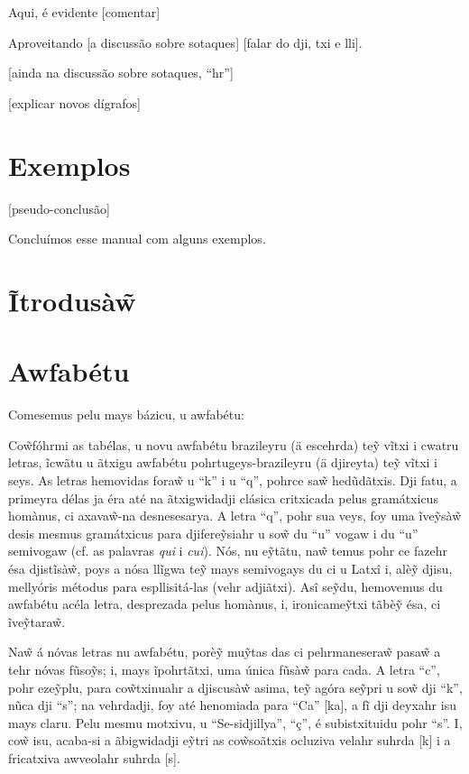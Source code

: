 \documentclass[12pt, a5paper, titlepage]{article}
\begin{document}
\begin{bilingualpages}
    Aqui, é evidente [comentar]

    Aproveitando [a discussão sobre sotaques] [falar do dji, txi e lli].

    [ainda na discussão sobre sotaques, ``hr'']

    [explicar novos dígrafos]


    \section{Exemplos}
    [pseudo-conclusão]

    Concluímos esse manual com alguns exemplos.

    \leftpage
    \section{Ĩtrodusà\~w}

    \newpage
    \section{Awfabétu}
    Comesemus pelu mays bázicu, u awfabétu:
    \BrTableAbc

    Co\~wfóhrmi as tabélas, u novu awfabétu brazileyru (ä escehrda) te\~y vĩtxi i
    cwatru letras, ĩcwãtu u ãtxigu awfabétu pohrtugeys-brazileyru (ä djireyta)
    te\~y vĩtxi i seys. As letras hemovidas fora\~w u ``k'' i u ``q'', pohrce sa\~w
    hedũdãtxis. Dji fatu, a primeyra délas ja éra até na ãtxigwidadji clásica
    critxicada pelus gramátxicus homànus, ci axava\~w-na desnesesarya. A letra
    ``q'', pohr sua veys, foy uma ĩve\~ysà\~w desis mesmus gramátxicus para
    djifere\~ysiahr u so\~w du ``u'' vogaw i du ``u'' semivogaw (cf. as palavras
    \textit{qui} i \textit{cui}). Nós, nu e\~ytãtu, na\~w temus pohr ce fazehr ésa
    djistĩsà\~w, poys a nósa llĩgwa te\~y mays semivogays du ci u Latxî i, alè\~y djisu, mellyóris métodus para espllisitá-las (vehr adjiãtxi). Asî se\~ydu,
    hemovemus du awfabétu acéla letra, desprezada pelus homànus, i, ironicame\~ytxi tãbè\~y ésa, ci ĩve\~ytara\~w.

    Na\~w á nóvas letras nu awfabétu, porè\~y mu\~ytas das ci pehrmanesera\~w
    pasa\~w a tehr nóvas fũso\~ys; i, mays ĩpohrtãtxi, uma única fũsà\~w para cada.
    A letra ``c'', pohr eze\~yplu, para co\~wtxinuahr a djiscusà\~w asima, te\~y
    agóra se\~ypri u so\~w dji ``k'', nũca dji ``s''; na vehrdadji, foy até
    henomiada para ``Ca'' [ka], a fĩ dji deyxahr isu mays claru. Pelu mesmu
    motxivu, u ``Se-sidjillya'', ``ç'', é subistxituidu pohr ``s''. I, co\~w isu,
    acaba-si a ãbigwidadji e\~ytri as co\~wsoãtxis ocluziva velahr suhrda [k] i a
    fricatxiva awveolahr suhrda [s].


\end{bilingualpages}
\end{document}
